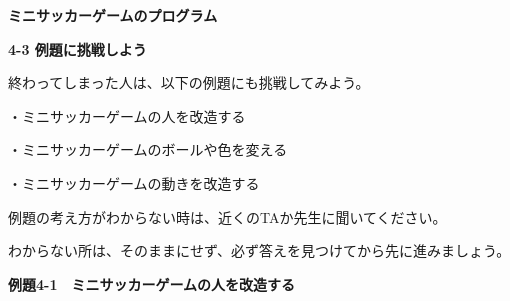 \documentclass[a4paper,dvipdfmx]{jarticle}
\newcommand\textstyleqwerty[1]{#1}
\begin{document}
\bigskip


\bigskip


\bigskip


\bigskip


\bigskip


\bigskip


\bigskip


\bigskip


\bigskip


\bigskip


\bigskip


\bigskip


\bigskip


\bigskip


\bigskip


\bigskip


\bigskip


\bigskip


\bigskip


\bigskip

{\bfseries
ミニサッカーゲームのプログラム}


\bigskip


\bigskip


\bigskip


\bigskip


\bigskip


\bigskip


\bigskip

{\bfseries
4-3 例題に挑戦しよう}


\bigskip

終わってしまった人は、以下の例題にも挑戦してみよう。


\bigskip

・ミニサッカーゲームの人を改造する

・ミニサッカーゲームのボールや色を変える

・ミニサッカーゲームの動きを改造する


\bigskip

例題の考え方がわからない時は、近くのTAか先生に聞いてください。

わからない所は、そのままにせず、必ず答えを見つけてから先に進みましょう。


\bigskip


\bigskip


\bigskip


\bigskip


\bigskip


\bigskip


\bigskip

\clearpage
\textstyleqwerty{\textbf{例題4-1　ミニサッカーゲームの人を改造する}}
\end{document}
